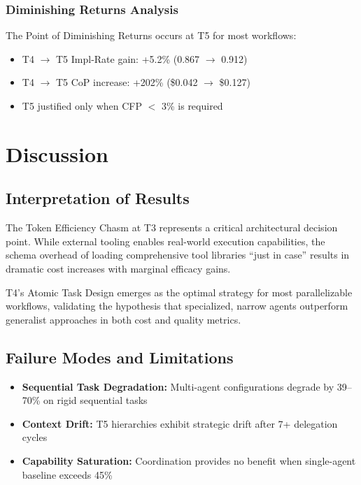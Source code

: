 \documentclass[11pt]{article}
\begin{document}
\subsubsection{Diminishing Returns Analysis}
The Point of Diminishing Returns occurs at T5 for most workflows:
\begin{itemize}
    \item T4 $\rightarrow$ T5 Impl-Rate gain: +5.2\% (0.867 $\rightarrow$ 0.912)
    \item T4 $\rightarrow$ T5 CoP increase: +202\% (\$0.042 $\rightarrow$ \$0.127)
    \item T5 justified only when CFP $<$ 3\% is required
\end{itemize}

\section{Discussion}

\subsection{Interpretation of Results}
The Token Efficiency Chasm at T3 represents a critical architectural decision point. While external tooling enables real-world execution capabilities, the schema overhead of loading comprehensive tool libraries ``just in case'' results in dramatic cost increases with marginal efficacy gains.

T4's Atomic Task Design emerges as the optimal strategy for most parallelizable workflows, validating the hypothesis that specialized, narrow agents outperform generalist approaches in both cost and quality metrics.

\subsection{Failure Modes and Limitations}
\begin{itemize}
    \item \textbf{Sequential Task Degradation:} Multi-agent configurations degrade by 39--70\% on rigid sequential tasks
    \item \textbf{Context Drift:} T5 hierarchies exhibit strategic drift after 7+ delegation cycles
    \item \textbf{Capability Saturation:} Coordination provides no benefit when single-agent baseline exceeds 45\%
\end{itemize}
\end{document}
